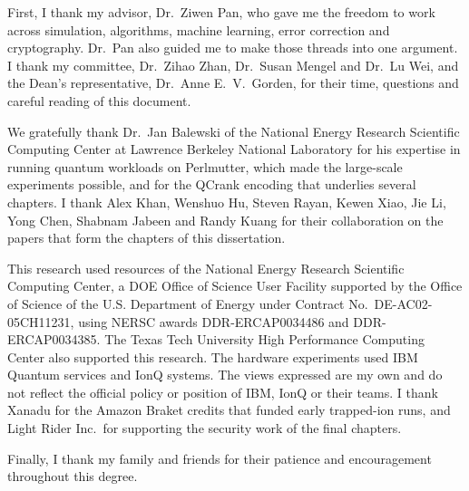 \begin{acknowledgments}
First, I thank my advisor, Dr.~Ziwen Pan, who gave me the freedom to work across simulation, algorithms, machine learning, error correction and cryptography. Dr.~Pan also guided me to make those threads into one argument. I thank my committee, Dr.~Zihao Zhan, Dr.~Susan Mengel and Dr.~Lu Wei, and the Dean's representative, Dr.~Anne E.~V.~Gorden, for their time, questions and careful reading of this document.

We gratefully thank Dr.~Jan Balewski of the National Energy Research Scientific Computing Center at Lawrence Berkeley National Laboratory for his expertise in running quantum workloads on Perlmutter, which made the large-scale experiments possible, and for the QCrank encoding that underlies several chapters. I thank Alex Khan, Wenshuo Hu, Steven Rayan, Kewen Xiao, Jie Li, Yong Chen, Shabnam Jabeen and Randy Kuang for their collaboration on the papers that form the chapters of this dissertation.

This research used resources of the National Energy Research Scientific Computing Center, a DOE Office of Science User Facility supported by the Office of Science of the U.S. Department of Energy under Contract No.~DE-AC02-05CH11231, using NERSC awards DDR-ERCAP0034486 and DDR-ERCAP0034385. The Texas Tech University High Performance Computing Center also supported this research. The hardware experiments used IBM Quantum services and IonQ systems. The views expressed are my own and do not reflect the official policy or position of IBM, IonQ or their teams. I thank Xanadu for the Amazon Braket credits that funded early trapped-ion runs, and Light Rider Inc.\ for supporting the security work of the final chapters.

Finally, I thank my family and friends for their patience and encouragement throughout this degree.
\end{acknowledgments}
